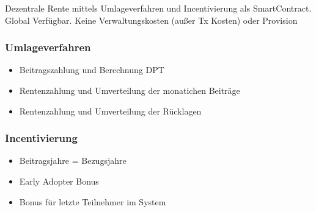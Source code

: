 Dezentrale Rente mittels Umlageverfahren und Incentivierung als SmartContract.
Global Verfügbar. Keine Verwaltungskosten (außer Tx Kosten) oder Provision

\subsubsection{Umlageverfahren}

\begin{itemize}
\item Beitragszahlung und Berechnung DPT
\item Rentenzahlung und Umverteilung der monatichen Beiträge
\item Rentenzahlung und Umverteilung der Rücklagen
\end{itemize}

\subsubsection{Incentivierung}

\begin{itemize}
\item Beitragsjahre = Bezugsjahre
\item Early Adopter Bonus
\item Bonus für letzte Teilnehmer im System
\end{itemize}